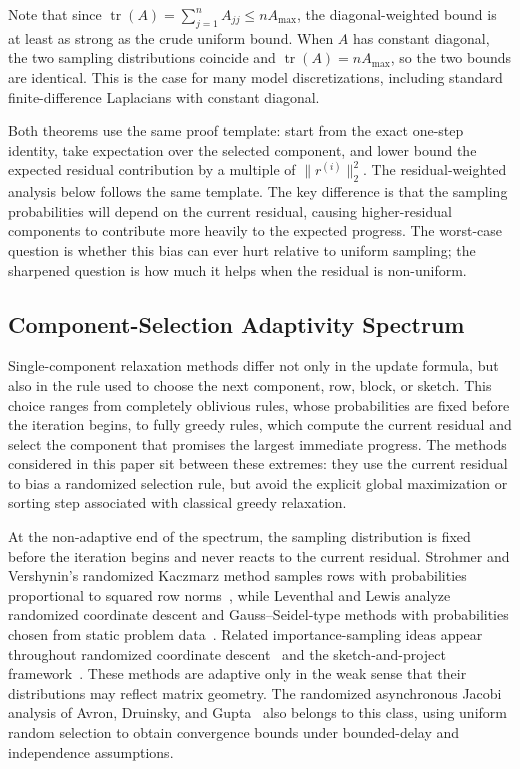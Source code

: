 \documentclass[pdflatex,sn-mathphys-num]{sn-jnl}%
\DeclareMathOperator{\Tr}{tr}
\newcommand{\norm}[2]{\|#1\|_{#2}}
\theoremstyle{thmstyleone}%
\theoremstyle{thmstyletwo}%
\theoremstyle{thmstylethree}%
\begin{document}
Note that since $\Tr(A) = \sum_{j=1}^n A_{jj} \leq n A_{\max}$,
the diagonal-weighted bound is at least as strong as the crude uniform bound.
When $A$ has constant diagonal, the two sampling distributions coincide and
$\Tr(A)=nA_{\max}$, so the two bounds are identical.  This is the case for many
model discretizations, including standard finite-difference Laplacians with
constant diagonal.

Both theorems use the same proof template: start from the exact one-step
identity, take expectation over the selected component, and lower bound the
expected residual contribution by a multiple of $\norm{r^{(i)}}{2}^2$.  The
residual-weighted analysis below follows the same template.  The key difference
is that the sampling probabilities will depend on the current residual, causing
higher-residual components to contribute more heavily to the expected progress.
The worst-case question is whether this bias can ever hurt relative to uniform
sampling; the sharpened question is how much it helps when the residual is
non-uniform.

\subsection{Component-Selection Adaptivity Spectrum}
\label{sect:sampling-adaptivity-spectrum}

Single-component relaxation methods differ not only in the update formula, but
also in the rule used to choose the next component, row, block, or sketch.  This
choice ranges from completely oblivious rules, whose probabilities are fixed
before the iteration begins, to fully greedy rules, which compute the current
residual and select the component that promises the largest immediate progress.
The methods considered in this paper sit between these extremes: they use the
current residual to bias a randomized selection rule, but avoid the explicit
global maximization or sorting step associated with classical greedy relaxation.

At the non-adaptive end of the spectrum, the sampling distribution is fixed
before the iteration begins and never reacts to the current residual.
Strohmer and Vershynin's randomized Kaczmarz method samples rows with
probabilities proportional to squared row norms~\cite{strohmer2009randomized},
while Leventhal and Lewis analyze randomized coordinate descent and
Gauss--Seidel-type methods with probabilities chosen from static problem
data~\cite{leventhal2010randomized}. Related importance-sampling ideas appear
throughout randomized coordinate descent~\cite{nesterov2012efficiency} and
the sketch-and-project framework~\cite{gower2015randomized}. These methods
are adaptive only in the weak sense that their distributions may reflect
matrix geometry. The randomized asynchronous Jacobi analysis of
Avron, Druinsky, and Gupta~\cite{avron2015revisiting} also belongs to this
class, using uniform random selection to obtain convergence bounds under
bounded-delay and independence assumptions.
\end{document}
